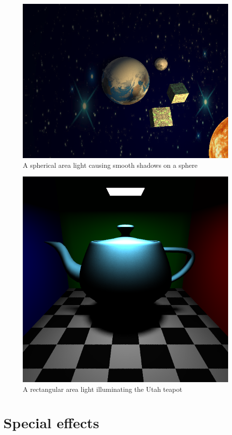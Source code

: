 \begin{figure}
\centering
\includegraphics[width=0.45\linewidth]{./img/borgEarth3}
\caption{A spherical area light causing smooth shadows on a sphere}
\label{fig:borgEarth}
\end{figure}
\begin{figure}
\centering
\includegraphics[width=0.45\linewidth]{./img/areaTeapot}
\caption{A rectangular area light illuminating the Utah teapot}
\label{fig:areaTeapot}
\end{figure}


\section{Special effects}
